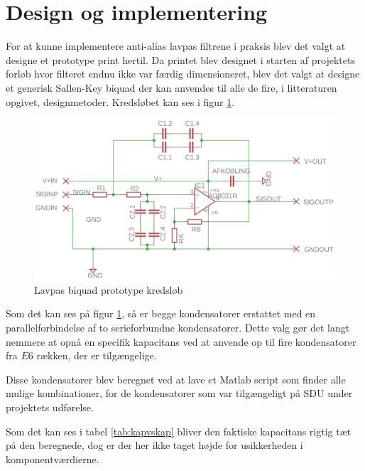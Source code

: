 \section{Design og implementering}\label{sec:filter_design}
For at kunne implementere anti-alias lavpas filtrene i praksis blev det valgt at designe et 
prototype print hertil. Da printet blev designet i starten af projektets forløb hvor filteret 
endnu ikke var færdig dimensioneret, blev det valgt at designe et generisk Sallen-Key biquad 
der kan anvendes til alle de fire, i litteraturen opgivet, designmetoder. Kredsløbet kan ses i 
figur \ref{fig:skbiquadsch}.



\begin{figure}[H]
	\centering
	\includegraphics[width=.7\linewidth]{billeder/skbiquadsch}
	\caption{Lavpas biquad prototype kredsløb}
	\label{fig:skbiquadsch}
\end{figure}

Som det kan ses på figur \ref{fig:skbiquadsch}, så er begge kondensatorer erstattet med en parallelforbindelse af 
to serieforbundne kondensatorer. Dette valg gør det langt nemmere at opnå en specifik 
kapacitans ved at anvende op til fire kondensatorer fra $E6$ rækken, der er tilgængelige.

Disse kondensatorer blev beregnet ved at lave et Matlab script som finder alle mulige kombinationer, for de kondensatorer som var tilgængeligt på SDU under projektets udførelse.

Som det kan ses i tabel \ref{tab:kapvskap} bliver den faktiske kapacitans rigtig tæt på den
beregnede, dog er der her ikke taget højde for usikkerheden i komponentværdierne.

